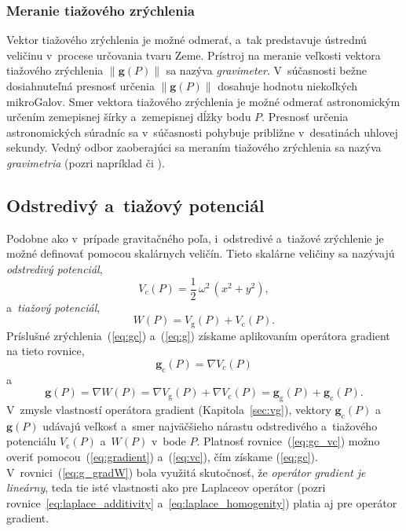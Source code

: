 \documentclass[a4paper,12pt]{book}
\newcommand{\gidx}{\mathrm g}
\newcommand{\cidx}{\mathrm c}
\let\vec\mathbf
\begin{document}
\subsubsection{Meranie tiažového zrýchlenia}

Vektor tiažového zrýchlenia je možné odmerať, a~tak predstavuje ústrednú 
veličinu v~procese určovania tvaru Zeme.  Prístroj na meranie veľkosti vektora 
tiažového zrýchlenia $\| \vec g(P) \|$ sa nazýva \emph{gravimeter}.  
V~súčasnosti bežne dosiahnuteľná presnosť určenia $\| \vec g(P) \|$ dosahuje 
hodnotu niekoľkých mikroGalov.  Smer vektora tiažového zrýchlenia je možné 
odmerať astronomickým určením zemepisnej šírky a~zemepisnej dĺžky bodu $P$.  
Presnosť určenia astronomických súradníc sa v~súčasnosti pohybuje približne 
v~desatinách uhlovej sekundy.    Vedný odbor zaoberajúci sa meraním tiažového 
zrýchlenia sa nazýva \emph{gravimetria} (pozri napríklad 
\cite{Torge1989,Rozimant1994} či \cite{Janak2010}).






\subsection{Odstredivý a~tiažový potenciál}
\label{sec:centrifugal_and_gravity_potential}

Podobne ako v~prípade gravitačného poľa, i~odstredivé a~tiažové zrýchlenie je
možné definovať pomocou skalárnych veličín.  Tieto skalárne veličiny sa
nazývajú \emph{odstredivý potenciál},
%
\begin{equation}
\label{eq:vc}
V_c(P) = \frac{1}{2} \, \omega^2 \, (x^2 + y^2){,}
\end{equation}
%
a~\emph{tiažový potenciál},
%
\begin{equation}
\label{eq:w}
W(P) = V_\gidx(P) + V_\cidx(P){.}
\end{equation}
%
Príslušné zrýchlenia~(\ref{eq:gc}) a~(\ref{eq:g}) získame aplikovaním operátora
gradient na tieto rovnice,
%
\begin{equation}
\label{eq:gc_vc}
\vec g_\cidx(P) = \nabla V_c(P)
\end{equation}
%
a
%
\begin{equation}
\label{eq:g_gradW}
\vec g(P) = \nabla W(P) = \nabla V_\gidx(P) + \nabla V_\cidx(P) = \vec
g_\gidx(P) + \vec g_\cidx(P){.}
\end{equation}
%
V~zmysle vlastností operátora gradient (Kapitola~\ref{sec:vg}), vektory $\vec
g_\cidx(P)$ a~$\vec g(P)$ udávajú veľkosť a~smer najväčšieho nárastu
odstredivého a~tiažového potenciálu $V_\cidx(P)$ a~$W(P)$ v~bode $P$.  Platnosť
rovnice~(\ref{eq:gc_vc}) možno overiť pomocou~(\ref{eq:gradient})
a~(\ref{eq:vc}), čím získame (\ref{eq:gc}).  V~rovnici~(\ref{eq:g_gradW}) bola
využitá skutočnosť, že \emph{operátor gradient je lineárny}, teda tie isté
vlastnosti ako pre Laplaceov operátor (pozri
rovnice~\ref{eq:laplace_additivity} a~\ref{eq:laplace_homogenity}) platia aj
pre operátor gradient.
\end{document}
